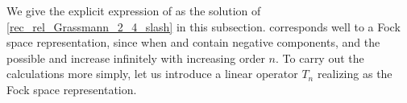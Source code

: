 \documentclass[pdftex]{sigma}
\numberwithin{equation}{section}
\begin{document}
We give the explicit expression of  as the solution of \eqref{rec_rel_Grassmann_2_4_slash} in this subsection.
corresponds
well to a Fock space representation,
since
when  and  contain negative components, and the possible  and  increase infinitely with increasing order $n$. To carry out the calculations more simply, let us introduce a linear operator $T_{n}$
realizing  as the Fock space representation.
\end{document}

